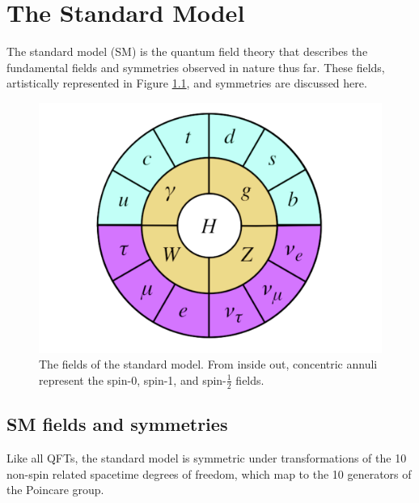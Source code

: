 \chapter{The Standard Model}
\label{chap:SM}
The standard model (SM) is the quantum field theory that describes the fundamental fields and symmetries observed in nature thus far.  These fields, artistically represented in Figure \ref{fig:SMcircle}, and symmetries are discussed here. 
\begin{figure}[h]
\centering
\includegraphics[width=.6\linewidth]{figures/SM/StandardModel2.png}
\caption{The fields of the standard model. From inside out, concentric annuli represent the spin-0, spin-1, and spin-$\frac{1}{2}$ fields.}
\label{fig:SMcircle}
\end{figure}

\section{SM fields and symmetries}
Like all QFTs, the standard model is symmetric under transformations of the 10 non-spin related spacetime degrees of freedom, which map to the 10 generators of the Poincare group. 

